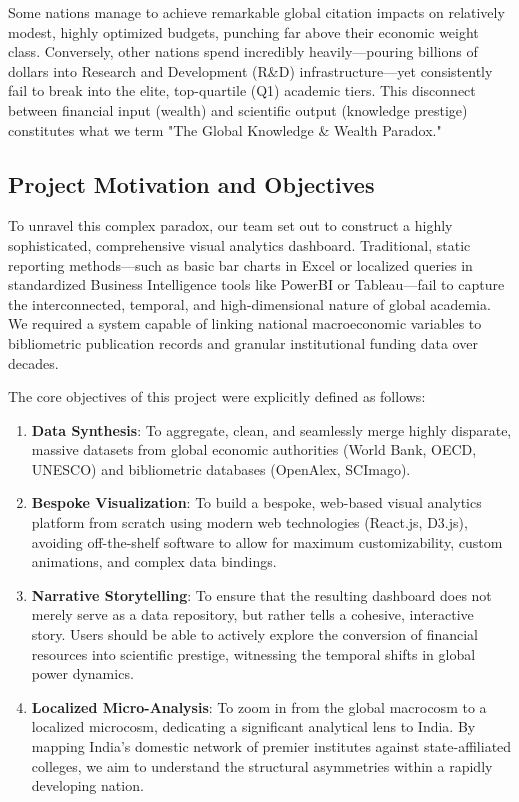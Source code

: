 \documentclass[12pt,a4paper]{article}
\begin{document}
Some nations manage to achieve remarkable global citation impacts on relatively modest, highly optimized budgets, punching far above their economic weight class. Conversely, other nations spend incredibly heavily---pouring billions of dollars into Research and Development (R\&D) infrastructure---yet consistently fail to break into the elite, top-quartile (Q1) academic tiers. This disconnect between financial input (wealth) and scientific output (knowledge prestige) constitutes what we term "The Global Knowledge \& Wealth Paradox."

\subsection{Project Motivation and Objectives}
To unravel this complex paradox, our team set out to construct a highly sophisticated, comprehensive visual analytics dashboard. Traditional, static reporting methods---such as basic bar charts in Excel or localized queries in standardized Business Intelligence tools like PowerBI or Tableau---fail to capture the interconnected, temporal, and high-dimensional nature of global academia. We required a system capable of linking national macroeconomic variables to bibliometric publication records and granular institutional funding data over decades.

The core objectives of this project were explicitly defined as follows:
\begin{enumerate}
    \item \textbf{Data Synthesis}: To aggregate, clean, and seamlessly merge highly disparate, massive datasets from global economic authorities (World Bank, OECD, UNESCO) and bibliometric databases (OpenAlex, SCImago).
    \item \textbf{Bespoke Visualization}: To build a bespoke, web-based visual analytics platform from scratch using modern web technologies (React.js, D3.js), avoiding off-the-shelf software to allow for maximum customizability, custom animations, and complex data bindings.
    \item \textbf{Narrative Storytelling}: To ensure that the resulting dashboard does not merely serve as a data repository, but rather tells a cohesive, interactive story. Users should be able to actively explore the conversion of financial resources into scientific prestige, witnessing the temporal shifts in global power dynamics.
    \item \textbf{Localized Micro-Analysis}: To zoom in from the global macrocosm to a localized microcosm, dedicating a significant analytical lens to India. By mapping India's domestic network of premier institutes against state-affiliated colleges, we aim to understand the structural asymmetries within a rapidly developing nation.
\end{enumerate}
\end{document}
